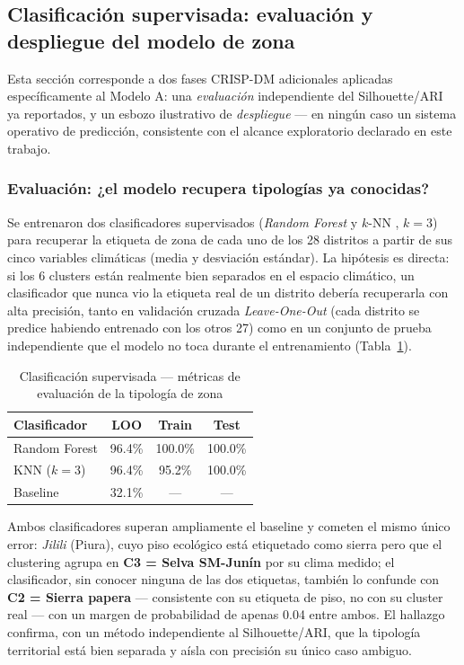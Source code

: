 \documentclass[conference]{IEEEtran}
\begin{document}
\subsection{Clasificación supervisada: evaluación y despliegue del modelo de zona}
\label{sec:clasificador}
Esta sección corresponde a dos fases CRISP-DM adicionales aplicadas específicamente al Modelo A: una \emph{evaluación} independiente del Silhouette/ARI ya reportados, y un esbozo ilustrativo de \emph{despliegue} --- en ningún caso un sistema operativo de predicción, consistente con el alcance exploratorio declarado en este trabajo.

\subsubsection{Evaluación: ¿el modelo recupera tipologías ya conocidas?}
Se entrenaron dos clasificadores supervisados (\textit{Random Forest} \cite{breiman2001randomforest} y $k$-NN \cite{cover1967nearestneighbor}, $k=3$) para recuperar la etiqueta de zona de cada uno de los 28 distritos a partir de sus cinco variables climáticas (media y desviación estándar). La hipótesis es directa: si los 6 clusters están realmente bien separados en el espacio climático, un clasificador que nunca vio la etiqueta real de un distrito debería recuperarla con alta precisión, tanto en validación cruzada \textit{Leave-One-Out} (cada distrito se predice habiendo entrenado con los otros 27) como en un conjunto de prueba independiente que el modelo no toca durante el entrenamiento (Tabla~\ref{tab:clasificador_eval}).

\begin{table}[h]
\centering
\caption{Clasificación supervisada --- métricas de evaluación de la tipología de zona}
\label{tab:clasificador_eval}
\small
\begin{tabular}{l c c c}
\toprule
\textbf{Clasificador} & \textbf{LOO} & \textbf{Train} & \textbf{Test} \\
\midrule
Random Forest & 96.4\% & 100.0\% & 100.0\% \\
KNN ($k=3$) & 96.4\% & 95.2\% & 100.0\% \\
\midrule
Baseline & 32.1\% & --- & --- \\
\bottomrule
\end{tabular}
\end{table}

Ambos clasificadores superan ampliamente el baseline y cometen el mismo único error: \emph{Jilili} (Piura), cuyo piso ecológico está etiquetado como sierra pero que el clustering agrupa en \textbf{C3 = Selva SM-Junín} por su clima medido; el clasificador, sin conocer ninguna de las dos etiquetas, también lo confunde con \textbf{C2 = Sierra papera} --- consistente con su etiqueta de piso, no con su cluster real --- con un margen de probabilidad de apenas 0.04 entre ambos. El hallazgo confirma, con un método independiente al Silhouette/ARI, que la tipología territorial está bien separada y aísla con precisión su único caso ambiguo.
\end{document}
